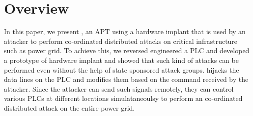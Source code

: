 \section{Overview}
\label{sec:implant-overview}





In this paper, we present \name, an APT using a hardware implant that is used by an attacker to perform co-ordinated distributed attacks on critical infrastructure such as power grid. To achieve this, we reversed engineered a PLC and developed a prototype of hardware implant and showed that such kind of attacks can be performed even without the help of state sponsored attack groups. \name hijacks the data lines on the PLC and modifies them based on the command received by the attacker. Since the attacker can send such signals remotely, they can control various PLCs at different locations simulataneoulsy to perform an co-ordinated distributed attack on the entire power grid.

